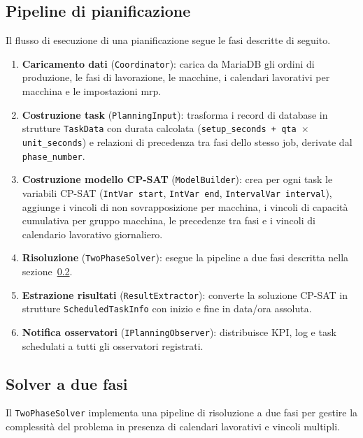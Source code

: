 \subsection{Pipeline di pianificazione}
\label{subsec:pipeline}

Il flusso di esecuzione di una pianificazione segue le fasi descritte di seguito.

\begin{enumerate}
    \item \textbf{Caricamento dati} (\texttt{Coordinator}): carica da MariaDB gli ordini di produzione, le fasi di lavorazione, le macchine, i calendari lavorativi per macchina e le impostazioni \gls{mrp}.
    \item \textbf{Costruzione task} (\texttt{PlanningInput}): trasforma i record di database in strutture \texttt{TaskData} con durata calcolata (\texttt{setup\_seconds + qta $\times$ unit\_seconds}) e relazioni di precedenza tra fasi dello stesso job, derivate dal \texttt{phase\_number}.
    \item \textbf{Costruzione modello CP-SAT} (\texttt{ModelBuilder}): crea per ogni task le variabili CP-SAT (\texttt{IntVar start}, \texttt{IntVar end}, \texttt{IntervalVar interval}), aggiunge i vincoli di non sovrapposizione per macchina, i vincoli di capacità cumulativa per gruppo macchina, le precedenze tra fasi e i vincoli di calendario lavorativo giornaliero.
    \item \textbf{Risoluzione} (\texttt{TwoPhaseSolver}): esegue la pipeline a due fasi descritta nella sezione~\ref{subsec:twophase}.
    \item \textbf{Estrazione risultati} (\texttt{ResultExtractor}): converte la soluzione CP-SAT in strutture \texttt{ScheduledTaskInfo} con inizio e fine in data/ora assoluta.
    \item \textbf{Notifica osservatori} (\texttt{IPlanningObserver}): distribuisce KPI, log e task schedulati a tutti gli osservatori registrati.
\end{enumerate}

\subsection{Solver a due fasi}
\label{subsec:twophase}

Il \texttt{TwoPhaseSolver} implementa una pipeline di risoluzione a due fasi per gestire la complessità del problema in presenza di calendari lavorativi e vincoli multipli.

